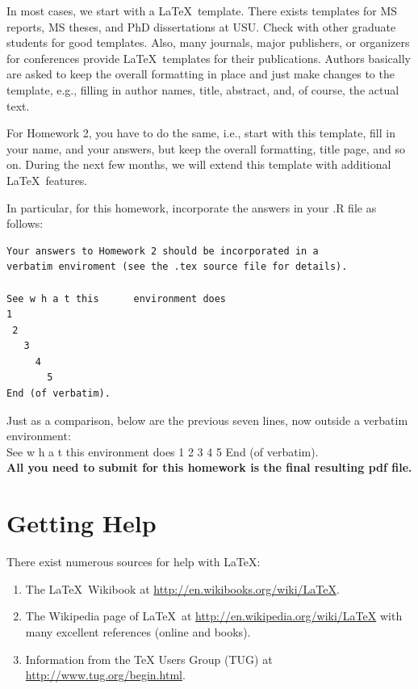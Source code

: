 \documentclass[12pt]{article}
\begin{document}
In most cases, we start with a \LaTeX\ template. There exists templates for
MS reports, MS theses, and PhD dissertations at USU. Check with other graduate
students for good templates. Also, many journals, major publishers, or organizers
for conferences provide \LaTeX\ templates for their publications. Authors
basically are asked to keep the overall formatting in place and
just make changes to the template, e.g., filling in author names,
title, abstract, and, of course, the actual text.

For Homework 2, you have to do the same, i.e., start with this template,
fill in your name, and your answers, but keep the overall formatting, title page, and so on.
During the next few months, we will extend this template with additional
\LaTeX\ features.


\newpage


In particular, for this homework, incorporate the answers in your .R file as follows:

{\small
\begin{verbatim}
Your answers to Homework 2 should be incorporated in a 
verbatim enviroment (see the .tex source file for details).

See w h a t this      environment does
1
 2
   3
     4
       5
End (of verbatim).
\end{verbatim}
}

Just as a comparison, below are the previous seven lines, now outside a verbatim environment: \\[1cm]

 See w h a t this      environment does
1
 2
   3
     4
       5
End (of verbatim). \\[1cm]

\noindent
{\bf \Large All you need to submit for this homework is the final resulting pdf file.}


\section{Getting Help}

There exist numerous sources for help with \LaTeX:

\begin{enumerate}
\item The \LaTeX\ Wikibook at \url{http://en.wikibooks.org/wiki/LaTeX}.

\item The Wikipedia page of \LaTeX\ at \url{http://en.wikipedia.org/wiki/LaTeX}
with many excellent references (online and books).

\item Information from the TeX Users Group (TUG) at
\url{http://www.tug.org/begin.html}.
\end{enumerate}
\end{document}
